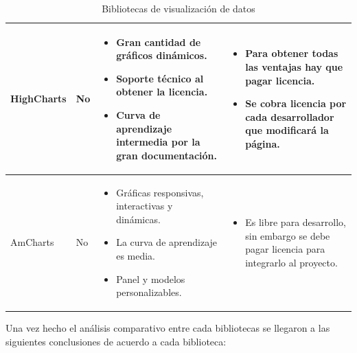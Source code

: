 \begin{table}[!htb]
{\begin{tabular}{ |p{2.2cm}|p{2.4cm}|p{4cm}|p{4cm}|  }
            HighCharts & No & \begin{itemize}[left=0pt]
                                  \item Gran cantidad de gráficos dinámicos.
                                  \item Soporte técnico al obtener la licencia.
                                  \item Curva de aprendizaje intermedia por la gran documentación.
                                \end{itemize} & \begin{itemize}[left=0pt]
                                                    \item Para obtener todas las ventajas hay que pagar licencia.
                                                    \item Se cobra licencia por cada desarrollador que modificará la página.
                                                  \end{itemize} \\
            \hline
            
            AmCharts & No & \begin{itemize}[left=0pt]
                               \item Gráficas responsivas, interactivas y dinámicas.
                               \item La curva de aprendizaje es media.
                               \item Panel y modelos personalizables.
                             \end{itemize} & \begin{itemize}[left=0pt]
                                               \item Es libre para desarrollo, sin embargo se debe pagar licencia para integrarlo al proyecto.
                                             \end{itemize} \\
            \hline
        \end{tabular}%
    }
    \caption{Bibliotecas de visualización de datos} \label{tab:biblioVis}
\end{table}

Una vez hecho el análisis comparativo entre cada bibliotecas se llegaron a las siguientes conclusiones de acuerdo a cada biblioteca:

